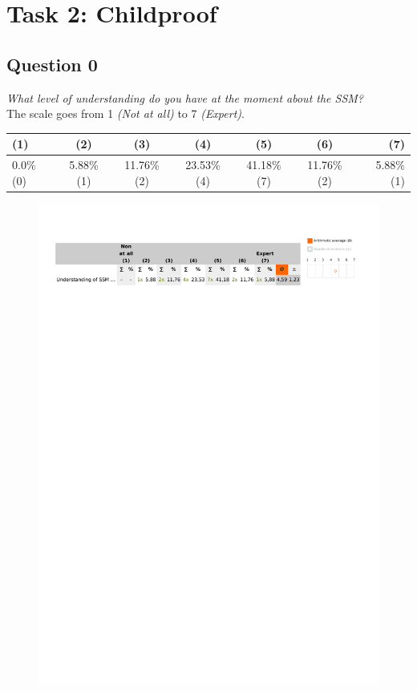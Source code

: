 \section{Task 2: Childproof} %
\label{sec:res_childproof_task}

\subsection{Question 0}\label{question2:0}
\emph{What level of understanding do you have at the moment about the SSM?}\\

The scale goes from 1 \emph{(Not at all)} to 7 \emph{(Expert)}.
\begin{table}[H]
	\begin{center}
		\small \begin{tabular*}{1.15\columnwidth}{lcccccr}
			\\ \hline \hline
			(1) & (2) & (3) & (4) & (5) & (6) & (7) \\ \hline \hline

		 	0.0\% (0) & 5.88\% (1) & 11.76\% (2) & 23.53\% (4) & 41.18\% (7) & 11.76\% (2) & 5.88\% (1)\\ \hline
		\end{tabular*}
	\end{center}
\end{table}

\begin{figure}[H]
	\centering
	\includegraphics[width=0.6\linewidth]{gfx/Chapter_EvaluationResults/ChildproofTask/question0}
\end{figure}

